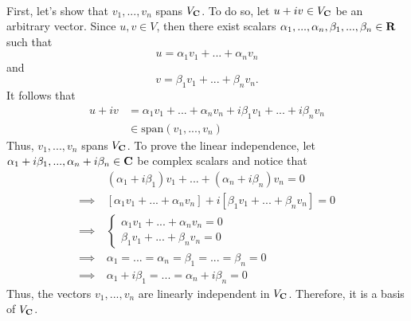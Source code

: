 \begin{solution}
    \\ First, let's show that $v_1, ..., v_n$ spans $V_{\mathbf{C}}$. To do so, let $u+iv \in V_{\mathbf{C}}$ be an arbitrary vector. Since $u,v \in V$, then there exist scalars $\alpha_1, ..., \alpha_n, \beta_1, ..., \beta_n \in \mathbf{R}$ such that
    $$u = \alpha_1 v_1 + ... + \alpha_n v_n$$
    and 
    $$v = \beta_1 v_1 + ... + \beta_n v_n.$$
    It follows that
    \begin{align*}
        u + iv &= \alpha_1 v_1 + ... + \alpha_n v_n + i\beta_1 v_1 + ... + i\beta_n v_n \\
        & \in \text{span}(v_1, ..., v_n)
    \end{align*}
    Thus, $v_1, ..., v_n$ spans $V_{\mathbf{C}}$. To prove the linear independence, let $\alpha_1 + i \beta_1, ..., \alpha_n + i\beta_n \in \mathbf{C}$ be complex scalars and notice that
    \begin{align*}
        & (\alpha_1 + i \beta_1)v_1 + ... + (\alpha_n + i\beta_n)v_n = 0 \\
        \implies \ & [\alpha_1 v_1 + ... + \alpha_n v_n] + i[\beta_1 v_1 + ... + \beta_n v_n] = 0 \\
        \implies \ & \begin{cases}
            \alpha_1 v_1 + ... + \alpha_n v_n = 0 \\ \beta_1 v_1 + ... + \beta_n v_n = 0
        \end{cases} \\
        \implies \ & \alpha_1 = ... = \alpha_n = \beta_1 = ... = \beta_n = 0 \\
        \implies \ & \alpha_1 + i\beta_1 = ... = \alpha_n + i\beta_n = 0
    \end{align*}
    Thus, the vectors $v_1, ..., v_n$ are linearly independent in $V_{\mathbf{C}}$. Therefore, it is a basis of $V_{\mathbf{C}}$.
\end{solution}

